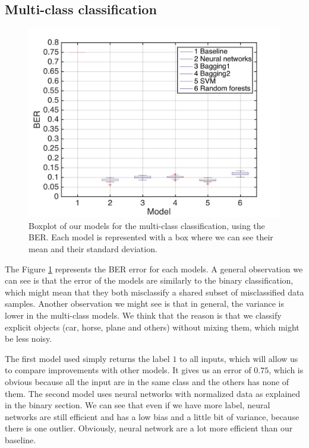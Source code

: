 \documentclass{article} %
\begin{document}
\subsection{Multi-class classification}

\begin{figure}
\center
\includegraphics[width=5in]{figures/multiclassifications.jpg} 
\caption{Boxplot of our models for the multi-class classification, using the BER. Each model is represented with a box where we can see their mean and their standard deviation.}
\label{fig:mul_models}
\end{figure}

The Figure \ref{fig:mul_models} represents the BER error for each models. A general observation we can see is that the error of the models are similarly to the binary classification, which might mean that they both misclassify a shared subset of misclassified data samples. 
Another observation we might see is that in general, the variance is lower in the multi-class models. We think that the reason is that we classify explicit objects (car, horse, plane and others) without mixing them, which might be less noisy.

The first model used simply returns the label $1$ to all inputs, which will allow us to compare improvements with other models. It gives us an error of $0.75$, which is obvious because all the input are in the same class and the others has none of them. The second model uses neural networks with normalized data as explained in the binary section. We can see that even if we have more label, neural networks are still efficient and has a low bias and a little bit of variance, because there is one outlier. Obviously, neural network are a lot more efficient than our baseline.
\end{document}
